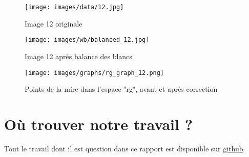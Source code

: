 \documentclass[12pt]{article}
\begin{document}
\begin{figure}[H]
    \centering
    \begin{minipage}{0.32\textwidth}
        \centering
        \texttt{[image: images/data/12.jpg]}
        \caption{Image 12 originale}
    \end{minipage}
    \hfill
    \begin{minipage}{0.32\textwidth}
        \centering
        \texttt{[image: images/wb/balanced\_12.jpg]}
        \caption{Image 12 après balance des blancs}
    \end{minipage}
    \begin{minipage}{0.32\textwidth}
        \centering
        \texttt{[image: images/graphs/rg\_graph\_12.png]}
        \caption{Points de la mire dans l'espace "rg", avant et après correction}
    \end{minipage}
\end{figure}

\clearpage

\section{Où trouver notre travail ?}

Tout le travail dont il est question dans ce rapport est disponible sur \href{https://github.com/antoinedenovembre/colorimetry_project_2}{github}.
\end{document}

